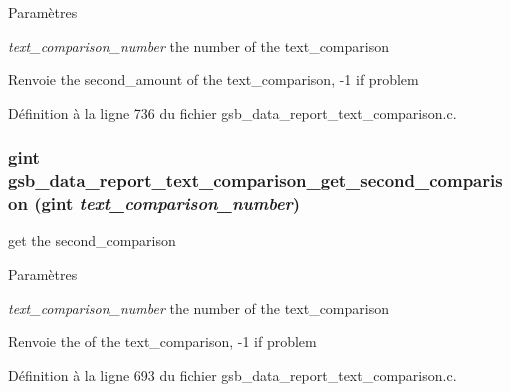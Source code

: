\begin{DoxyParams}{Paramètres}
\item[{\em text\_\-comparison\_\-number}]the number of the text\_\-comparison\end{DoxyParams}
\begin{DoxyReturn}{Renvoie}
the second\_\-amount of the text\_\-comparison, -\/1 if problem 
\end{DoxyReturn}


Définition à la ligne 736 du fichier gsb\_\-data\_\-report\_\-text\_\-comparison.c.

\subsubsection[{gsb\_\-data\_\-report\_\-text\_\-comparison\_\-get\_\-second\_\-comparison}]{\setlength{\rightskip}{0pt plus 5cm}gint gsb\_\-data\_\-report\_\-text\_\-comparison\_\-get\_\-second\_\-comparison (gint {\em text\_\-comparison\_\-number})}\label{gsb__data__report__text__comparison_8c_aefee06554ddb50e610a661ee4b7ad438}
get the second\_\-comparison


\begin{DoxyParams}{Paramètres}
\item[{\em text\_\-comparison\_\-number}]the number of the text\_\-comparison\end{DoxyParams}
\begin{DoxyReturn}{Renvoie}
the of the text\_\-comparison, -\/1 if problem 
\end{DoxyReturn}


Définition à la ligne 693 du fichier gsb\_\-data\_\-report\_\-text\_\-comparison.c.

